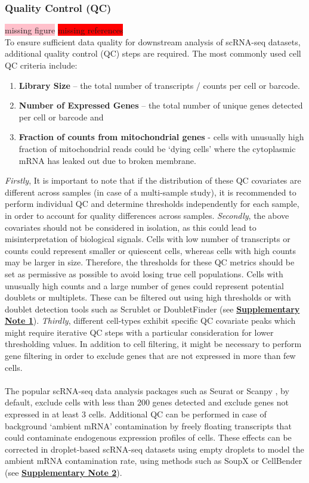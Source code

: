 \subsubsection{Quality Control (QC)}
\colorbox{pink}{missing figure} \colorbox{red}{missing references}\\
To ensure sufficient data quality for downstream analysis of scRNA-seq datasets, additional quality control (QC) steps are required. The most commonly used cell QC criteria include:
\begin{enumerate}
    \item \textbf{Library Size} – the total number of transcripts / counts per cell or barcode.
    \item \textbf{Number of Expressed Genes} – the total number of unique genes detected per cell or barcode and
    \item \textbf{Fraction of counts from mitochondrial genes } - cells with unusually high fraction of mitochondrial reads could be `dying cells’ where the cytoplasmic mRNA has leaked out due to broken membrane.
\end{enumerate}
\textit{Firstly}, It is important to note that if the distribution of these QC covariates are different across samples (in case of a multi-sample study), it is recommended to perform individual QC and determine thresholds independently for each sample, in order to account for quality differences across samples. \textit{Secondly}, the above covariates should not be considered in isolation, as this could lead to misinterpretation of biological signals. Cells with low number of transcripts or counts could represent smaller or quiescent cells, whereas cells with high counts may be larger in size. Therefore, the thresholds for these QC metrics should be set as permissive as possible to avoid losing true cell populations. Cells with unusually high counts and a large number of genes could represent potential doublets or multiplets. These can be filtered out using high thresholds or with doublet detection tools such as Scrublet or DoubletFinder (see \hyperref[sec:suppnote1]{\textbf{Supplementary Note 1}}). \textit{Thirdly}, different cell-types exhibit specific QC covariate peaks which might require iterative QC steps with a particular consideration for lower thresholding values. In addition to cell filtering, it might be necessary to perform gene filtering in order to exclude genes that are not expressed in more than few cells.\\\\The popular scRNA-seq data analysis packages such as Seurat \textbf{\cite{butler_integrating_2018,stuart_comprehensive_2019,hao_integrated_2021}} or Scanpy \textbf{\cite{wolf_scanpy_2018}}, by default, exclude cells with less than 200 genes detected and exclude genes not expressed in at least 3 cells. Additional QC can be performed in case of background `ambient mRNA’ contamination by freely floating transcripts that could contaminate endogenous expression profiles of cells. These effects can be corrected in droplet-based scRNA-seq datasets using empty droplets to model the ambient mRNA contamination rate, using methods such as SoupX \textbf{\cite{young_soupx_2020}} or CellBender \textbf{\cite{fleming_cellbender_2019}} (see \hyperref[sec:suppnote2]{\textbf{Supplementary Note 2}}).
\clearpage
